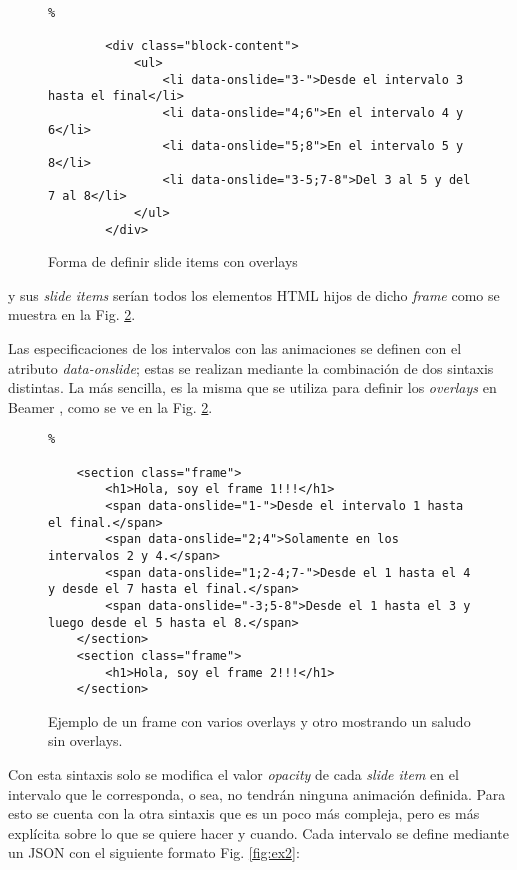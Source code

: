 				\begin{figure}[htb]%
					\begin{lstlisting}%

		<div class="block-content">
		    <ul>
		        <li data-onslide="3-">Desde el intervalo 3 hasta el final</li>
		        <li data-onslide="4;6">En el intervalo 4 y 6</li>
		        <li data-onslide="5;8">En el intervalo 5 y 8</li>
		        <li data-onslide="3-5;7-8">Del 3 al 5 y del 7 al 8</li>
		    </ul>          
		</div>	
					\end{lstlisting}
					\caption{Forma de definir slide items con overlays}
					\label{fig:slide_items_html}
				\end{figure}		
		
		y sus \textit{slide items} serían
		todos los elementos HTML hijos de dicho \textit{frame} como se muestra en la Fig. \ref{fig:ex1}.	 

		Las especificaciones de los intervalos con las animaciones se definen con el atributo \textit{data-onslide}; estas se realizan mediante la combinación de dos sintaxis distintas. La más sencilla, es la misma que se utiliza para definir los \textit{overlays} en Beamer \cite{overlay}, como se ve en la Fig. \ref{fig:ex1}. 
	 

			\begin{figure}[htb]%
				\begin{lstlisting}%

	<section class="frame">
		<h1>Hola, soy el frame 1!!!</h1>
	    <span data-onslide="1-">Desde el intervalo 1 hasta el final.</span>
	    <span data-onslide="2;4">Solamente en los intervalos 2 y 4.</span>
	    <span data-onslide="1;2-4;7-">Desde el 1 hasta el 4 y desde el 7 hasta el final.</span>
	    <span data-onslide="-3;5-8">Desde el 1 hasta el 3 y luego desde el 5 hasta el 8.</span>
	</section>
	<section class="frame">
		<h1>Hola, soy el frame 2!!!</h1>
	</section>
				\end{lstlisting}
			\caption{Ejemplo de un frame con varios overlays y otro mostrando un saludo sin overlays. \label{fig:ex1}}
			\end{figure}

		Con esta sintaxis solo se modifica el valor \textit{opacity} de cada \textit{slide item} en el intervalo que le corresponda, o sea, no tendrán ninguna animación definida. Para esto se cuenta con la otra sintaxis que es un poco más compleja, pero es más explícita sobre lo que se quiere hacer y cuando. Cada intervalo se define mediante un JSON con el siguiente formato Fig. \ref{fig:ex2}:

